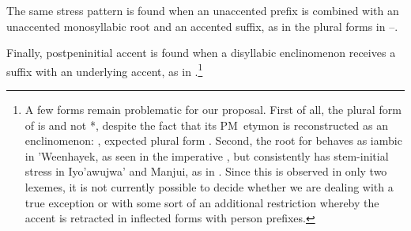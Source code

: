 \begin{exe}
    \ex \shoulder \label{anap-shoulder}
    \ex \shoulderblade
    \ex \elbow
    \ex \elderbro \label{anap-elderbro}
    \ex \eldersis \label{anap-eldersis}
    \ex \cheek
    \ex \snore
    \ex \leg \label{anap-leg}
    \ex \spank \label{anap-spank}
\end{exe}

The same stress pattern is found when an unaccented prefix is combined with an unaccented monosyllabic root and an accented suffix, as in the plural forms in –.

\begin{exe}
    \ex \tailpl \label{prostailpl}
    \ex \handpl
    \ex \languagewordpl
    \ex \lidpl
    \ex \basetrunkpl \label{prosbasetrunkpl}
\end{exe}

Finally, postpeninitial accent is found when a disyllabic enclinomenon receives a suffix with an underlying accent, as in .\footnote{A few forms remain problematic for our proposal. First of all, the plural form of  is  and not *, despite the fact that its PM~etymon is reconstructed as an enclinomenon: , expected plural form . Second, the root for behaves as iambic in 'Weenhayek, as seen in the imperative , but consistently has stem-initial stress in Iyo'awujwa' and Manjui, as in . Since this is observed in only two lexemes, it is not currently possible to decide whether we are dealing with a true exception or with some sort of an additional restriction whereby the accent is retracted in inflected forms with person prefixes.}

\begin{exe}
    \ex \starnpl \label{prosstarnpl}
\end{exe}

